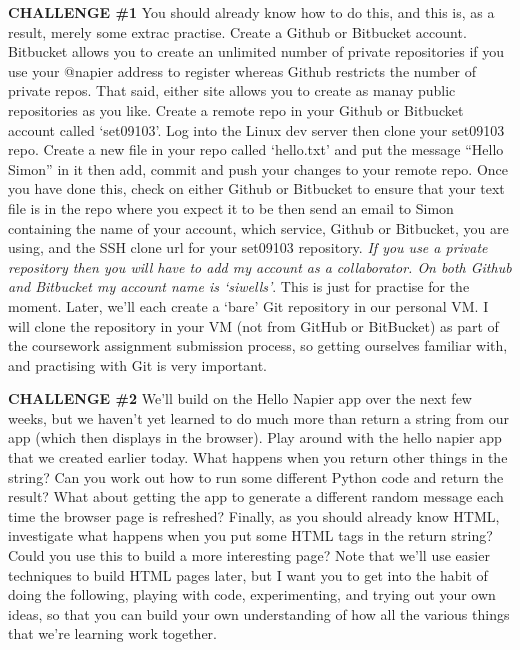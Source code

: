 \documentclass[12pt, a4paper, oneside]{book}
\begin{document}
\begin{framed}
\textbf{CHALLENGE \#1} You should already know how to do this, and this is, as a result, merely some extrac practise. Create a Github or Bitbucket account. Bitbucket allows you to create an unlimited number of private repositories if you use your @napier address to register whereas Github restricts the number of private repos. That said, either site allows you to create as manay public repositories as you like. Create a remote repo in your Github or Bitbucket account called `set09103'. Log into the Linux dev server then clone your set09103 repo. Create a new file in your repo called `hello.txt' and put the message ``Hello Simon'' in it then add, commit and push your changes to your remote repo. Once you have done this, check on either Github or Bitbucket to ensure that your text file is in the repo where you expect it to be then send an email to Simon containing the name of your account, which service, Github or Bitbucket, you are using, and the SSH clone url for your set09103 repository. {\emph{If you use a private repository then you will have to add my account as a collaborator. On both Github and Bitbucket my account name is `siwells'}}. This is just for practise for the moment. Later, we'll each create a `bare' Git repository in our personal VM. I will clone the repository in your VM (not from GitHub or BitBucket) as part of the coursework assignment submission process, so getting ourselves familiar with, and practising with Git is very important.
\end{framed}
\begin{framed}
\textbf{CHALLENGE \#2} We'll build on the Hello Napier app over the next few weeks, but we haven't yet learned to do much more than return a string from our app (which then displays in the browser). Play around with the hello napier app that we created earlier today. What happens when you return other things in the string? Can you work out how to run some different Python code and return the result? What about getting the app to generate a different random message each time the browser page is refreshed? Finally, as you should already know HTML, investigate what happens when you put some HTML tags in the return string? Could you use this to build a more interesting page? Note that we'll use easier techniques to build HTML pages later, but I want you to get into the habit of doing the following, playing with code, experimenting, and trying out your own ideas, so that you can build your own understanding of how all the various things that we're learning work together.
\end{framed}
\end{document}
